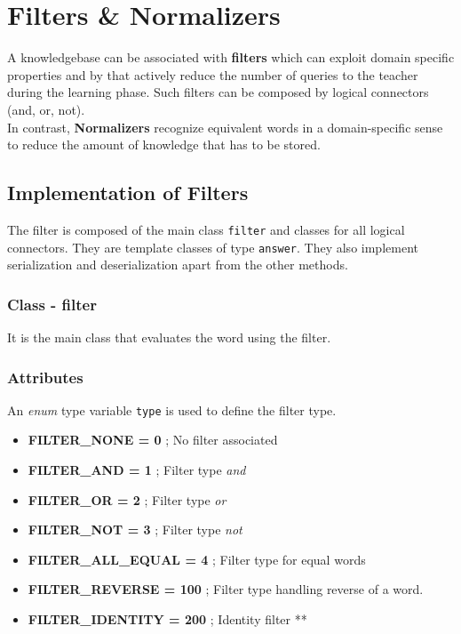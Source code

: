 \chapter{Filters \& Normalizers}
A knowledgebase can be associated with \textbf{filters} which can exploit domain specific properties and by that actively reduce the number of queries to the teacher during the learning phase. Such filters can be composed by logical connectors (and, or, not). \\
In contrast, \textbf{Normalizers} recognize equivalent words in a domain-specific sense to reduce the amount of knowledge that has to be stored.

\section{Implementation of Filters}
The filter is composed of the main class \texttt{filter} and classes for all logical connectors. They are template classes of type \texttt{answer}. They also implement serialization and deserialization apart from the other methods.

\subsection{Class - filter}
It is the main class that evaluates the word using the filter.

\subsection*{Attributes}
An \emph{enum} type variable \texttt{type} is used to define the filter type.
\begin{itemize}
 \item \textbf{FILTER\_NONE = 0} ; No filter associated
 \item \textbf{FILTER\_AND = 1} ; Filter type \emph{and}
 \item \textbf{FILTER\_OR = 2} ; Filter type \emph{or}
 \item \textbf{FILTER\_NOT = 3} ; Filter type \emph{not}
 \item \textbf{FILTER\_ALL\_EQUAL = 4} ; Filter type for equal words
 \item \textbf{FILTER\_REVERSE = 100} ; Filter type handling reverse of a word.
 \item \textbf{FILTER\_IDENTITY = 200} ; Identity filter **
\end{itemize}


